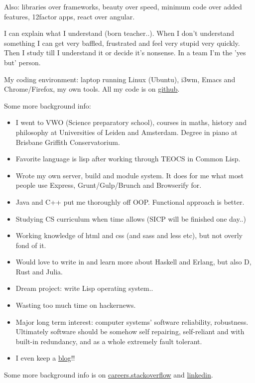 \documentclass[11pt]{article}
\begin{document}
Also: libraries over frameworks, beauty over speed, minimum code over added features, 12factor apps, react over angular.

I can explain what I understand (born teacher..). When I don't understand something I can get very baffled, frustrated and feel very stupid very quickly. Then I study till I understand it or decide it's nonsense. In a team I'm the 'yes but' person. 

My coding environment: laptop running Linux (Ubuntu), i3wm, Emacs and Chrome/Firefox, my own tools. All my code is on \href{http://github.com/michieljoris}{github}.

Some more background info:

\begin{itemize}
\item I went to VWO (Science preparatory school), courses in maths, history and philosophy at Universities of Leiden and Amsterdam. Degree in piano at Brisbane Griffith Conservatorium.
\item Favorite language is lisp after working through TEOCS in Common Lisp.
\item Wrote my own server, build and module system. It does for me what most people use Express, Grunt/Gulp/Brunch and Browserify for.
\item Java and C++ put me thoroughly off OOP. Functional approach is better.
\item Studying CS curriculum when time allows (SICP will be finished one day..)
\item Working knowledge of html and css (and sass and less etc), but not overly fond of it.
\item Would love to write in and learn more about Haskell and Erlang, but also D, Rust and Julia.
\item Dream project: write Lisp operating system..
\item Wasting too much time on hackernews.
\item Major long term interest: computer systems' software reliability, robustness. Ultimately
software should be somehow self repairing, self-reliant and with built-in
redundancy, and as a whole extremely fault tolerant.
\item I even keep a \href{http://www.axion5.net}{blog}!!
\end{itemize}

Some more background info is on \href{http://careers.stackoverflow.com/michieljoris}{careers.stackoverflow} and \href{http://nl.linkedin.com/in/michieljoris/}{linkedin}.
\end{document}
